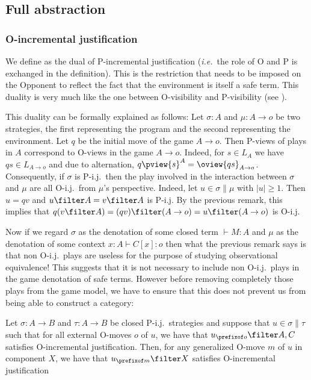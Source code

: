 \subsection{Full abstraction}

\subsubsection{O-incremental justification}

We define  as the dual of
P-incremental justification ({\it i.e.}~the role of O and P is
exchanged in the definition). This is the restriction that needs to
be imposed on the Opponent to reflect the fact that the environment
is itself a safe term. This duality is very much like the one
between O-visibility and P-visibility (see
\cite[Sec.~3.6]{Harmer2005}).

This duality can be formally explained as follows: Let $\sigma : A$
and $\mu : A \rightarrow o$ be two strategies, the first
representing the program and the second representing the
environment. Let $q$ be the initial move of the game $A \rightarrow
o$. Then P-views of plays in $A$ correspond to O-views in the game
$A \rightarrow o$. Indeed, for $s\in L_A$ we have $q s \in L_{A
\rightarrow o}$ and due to alternation, $q \pview{s}^A = \oview{q s
}_{A \rightarrow o}$. Consequently, if $\sigma$ is P-i.j.\ then the
play involved in the interaction between $\sigma$ and $\mu$ are all
O-i.j.\ from $\mu$'s perspective. Indeed, let $u \in \sigma \| \mu$
with $|u|\geq1$. Then $u=q v$ and $u\filter A = v \filter A$ is
P-i.j. By the previous remark, this implies that $q (v\filter A) =
(q v)\filter (A \rightarrow o) = u \filter (A \rightarrow o)$ is
O-i.j.
\smallskip

Now if we regard $\sigma$ as the denotation of some closed term
$\vdash M:A$ and $\mu$ as the denotation of some context $x:A \vdash
C[x]:o$ then what the previous remark says is that non O-i.j.\ plays
are useless for the purpose of studying observational equivalence!
This suggests that it is not necessary to include non O-i.j.\ plays
in the game denotation of safe terms. However before removing
completely those plays from the game model, we have to ensure that
this does not prevent us from being able to construct a category:
\begin{lemma}
\label{lem:oij_decomp}
Let $\sigma : A\rightarrow B$ and $\tau : A\rightarrow B$ be closed P-i.j.\ strategies and suppose
that $u\in \sigma \| \tau$ such that for all external O-moves $o$ of $u$, we have that $u_{\prefixof o} \filter A,C$ satisfies
O-incremental justification. Then, for any generalized O-move $m$ of $u$ in component $X$, we have that
$u_{\prefixof m} \filter X$ satisfies O-incremental justification
\end{lemma}


